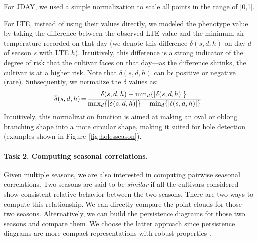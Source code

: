 For JDAY, we used a simple normalization to scale all points in the range of [0,1]. 

For LTE, instead of using their values directly, we modeled the phenotype value by taking the difference between the observed LTE value and the minimum air temperature recorded on that day (we denote this difference $\delta(s,d,h)$ on day $d$ of season $s$ with LTE $h$). Intuitively, this difference is a strong indicator of the degree of risk that the cultivar faces on that day---as the difference shrinks, the cultivar is at a higher risk.
Note that $\delta(s,d,h)$ can be positive or negative (rare).
Subsequently, we normalize the $\delta$ values as:
\begin{equation}\label{eqn:norm}
\hspace*{-0.05in}
\overline\delta(s,d,h) \hspace*{-0.02in} = \hspace*{-0.02in}
\frac{\delta(s,d,h)-\min_d\{|\delta(s,d,h)|\}\,}{\max_d\{|\delta(s,d,h)|\}-\min_d\{|\delta(s,d,h)|\}} 
\end{equation}
Intuitively, this normalization function is aimed at making an oval or oblong branching shape into a more circular shape, making it suited for hole detection (examples shown in Figure~\ref{fig:holesseason}).




\paragraph{Task 2. Computing seasonal correlations.}
Given multiple seasons, we are also interested in computing pairwise seasonal correlations. Two seasons are said to be \emph{similar} if all the cultivars considered show consistent relative behavior between the two seasons. 
There are two ways to compute this relationship. 
We can directly compare the point clouds for those two seasons. 
Alternatively, we can build the persistence diagrams for those two seasons and compare them. 
We choose the latter approach since persistence diagrams are more compact representations with robust properties \cite{edelsbrunner_persistent_2013}.



